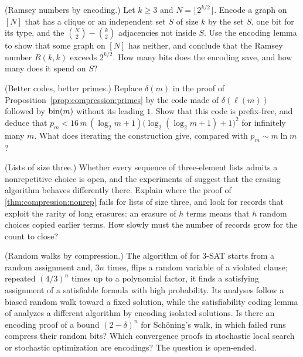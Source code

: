 \begin{refsection}
\begin{exercises}
\item\label{ex:compression:ramsey} \transfer (Ramsey numbers by encoding.) Let $k\ge3$ and $N=\lfloor2^{k/2}\rfloor$. Encode a graph on $[N]$ that has a clique or an independent set $S$ of size $k$ by the set $S$, one bit for its type, and the $\binom N2-\binom k2$ adjacencies not inside $S$. Use the encoding lemma to show that some graph on $[N]$ has neither, and conclude that the Ramsey number $R(k,k)$ exceeds $2^{k/2}$. How many bits does the encoding save, and how many does it spend on $S$?

\item\label{ex:compression:primes} \transfer\hard (Better codes, better primes.) Replace $\delta(m)$ in the proof of Proposition~\ref{prop:compression:primes} by the code made of $\delta(\ell(m))$ followed by $\operatorname{bin}(m)$ without its leading $1$. Show that this code is prefix-free, and deduce that $p_m<16\,m\,(\log_2m+1)\bigl(\log_2(\log_2m+1)+1\bigr)^2$ for infinitely many $m$. What does iterating the construction give, compared with $p_m\sim m\ln m$? 

\item\label{ex:compression:thue3} \research (Lists of size three.) Whether every sequence of three-element lists admits a nonrepetitive choice is open, and the experiments of \textcite{GrytczukKozikMicek2013} suggest that the erasing algorithm behaves differently there. Explain where the proof of \cref{thm:compression:nonrep} fails for lists of size three, and look for records that exploit the rarity of long erasures: an erasure of $h$ terms means that $h$ random choices copied earlier terms. How slowly must the number of records grow for the count to close?

\item\label{ex:compression:schoening} \research\harder (Random walks by compression.) The algorithm of \textcite{Schoning1999} for 3-SAT starts from a random assignment and, $3n$ times, flips a random variable of a violated clause; repeated $(4/3)^n$ times up to a polynomial factor, it finds a satisfying assignment of a satisfiable formula with high probability. Its analyses follow a biased random walk toward a fixed solution, while the satisfiability coding lemma of \textcite{PaturiPudlakZane1997} analyzes a different algorithm by encoding isolated solutions. Is there an encoding proof of a bound $(2-\delta)^n$ for Sch\"oning's walk, in which failed runs compress their random bits? Which convergence proofs in stochastic local search or stochastic optimization are encodings? The question is open-ended. 
\end{exercises}


\end{refsection}
